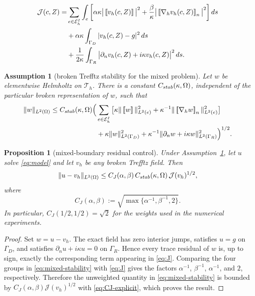 \documentclass[10pt,a4paper]{amsart}
\newtheorem{assumption}{Assumption}
\newtheorem{proposition}{Proposition}
\newcommand{\Ei}{\mathcal E_h^{\rm I}}
\newcommand{\jump}[1]{\left[\!\left[#1\right]\!\right]}
\newcommand{\jumpn}[1]{\left[\!\left[#1\right]\!\right]_{n}}
\begin{document}
\begin{align}\label{eq:J}
 \mathcal J(c,Z)=&\sum_{e\in\Ei}\int_e
 \left[
 \alpha\kappa\big|\jump{v_h(c,Z)}\big|^2
 +\frac{\beta}{\kappa}\big|\jumpn{\nabla_hv_h(c,Z)}\big|^2
 \right]ds\\
 &+\alpha\kappa\int_{\Gamma_D}|v_h(c,Z)-g|^2\,ds\nonumber\\
 &+\frac{1}{2\kappa}\int_{\Gamma_R}
 \big|\partial_nv_h(c,Z)+i\kappa v_h(c,Z)\big|^2\,ds.\nonumber
\end{align}

\begin{assumption}[broken Trefftz stability for the mixed problem]\label{ass:mixed-stability}
Let $w$ be elementwise Helmholtz on $\mathcal T_h$.  There is a constant $C_{\rm stab}(\kappa,\Omega)$, independent of the particular broken representation of $w$, such that
\begin{equation}\label{eq:mixed-stability}
\begin{aligned}
 \|w\|_{L^2(\Omega)} \le C_{\rm stab}(\kappa,\Omega)\Big(&
 \sum_{e\in\mathcal E_h^I}\big[\kappa\|\jump{w}\|_{L^2(e)}^2
 +\kappa^{-1}\|\jumpn{\nabla_h w}\|_{L^2(e)}^2\big]\\
 &+\kappa\|w\|_{L^2(\Gamma_D)}^2
 +\kappa^{-1}\|\partial_n w+i\kappa w\|_{L^2(\Gamma_R)}^2\Big)^{1/2}.
\end{aligned}
\end{equation}
\end{assumption}

\begin{proposition}[mixed-boundary residual control]\label{prop:mixed-control}
Under Assumption~\ref{ass:mixed-stability}, let $u$ solve \eqref{eq:model} and let $v_h$ be any broken Trefftz field.  Then
\begin{equation}\label{eq:mixed-J-bound}
 {\|u-v_h\|_{L^2(\Omega)}\le C_J(\alpha,\beta)\,
 C_{\rm stab}(\kappa,\Omega)\,\mathcal J(v_h)^{1/2},}
\end{equation}
where
\begin{equation}\label{eq:CJ-explicit}
 C_J(\alpha,\beta)
 :=\sqrt{\max\{\alpha^{-1},\beta^{-1},2\}}.
\end{equation}
In particular, $C_J(1/2,1/2)=\sqrt2$ for the weights used in the numerical experiments.
\end{proposition}

\begin{proof}
Set $w=u-v_h$.  The exact field has zero interior jumps, satisfies $u=g$ on $\Gamma_D$, and satisfies $\partial_nu+i\kappa u=0$ on $\Gamma_R$.  Hence every trace residual of $w$ is, up to sign, exactly the corresponding term appearing in \eqref{eq:J}.  Comparing the four groups in \eqref{eq:mixed-stability} with \eqref{eq:J} gives the factors $\alpha^{-1}$, $\beta^{-1}$, $\alpha^{-1}$, and $2$, respectively.  Therefore the unweighted quantity in \eqref{eq:mixed-stability} is bounded by $C_J(\alpha,\beta)\mathcal J(v_h)^{1/2}$ with \eqref{eq:CJ-explicit}, which proves the result.
\end{proof}
\end{document}
